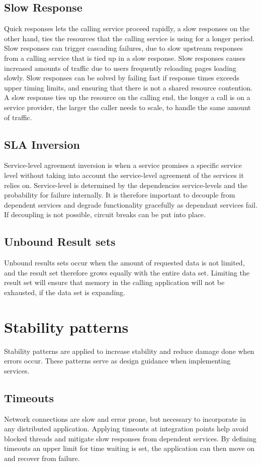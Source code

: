 \subsection{Slow Response}
Quick responses lets the calling service proceed rapidly, a slow responses on the other hand, ties the resources that the calling service is using for a longer period. Slow responses can trigger cascading failures, due to slow upstream responses from a calling service that is tied up in a slow response. Slow responses causes increased amounts of traffic due to users frequently reloading pages loading slowly. Slow responses can be solved by failing fast if response times exceeds upper timing limits, and ensuring that there is not a shared resource contention.
A slow response ties up the resource on the calling end, the longer a call is on a service provider, the larger the caller needs to scale, to handle the same amount of traffic.

\subsection{SLA Inversion}
Service-level agreement inversion is when a service promises a specific service level without taking into account the service-level agreement of the services it relies on. Service-level is determined by the dependencies service-levels and the probability for failure internally. It is therefore important to decouple from dependent services and degrade functionality gracefully as dependant services fail. If decoupling is not possible, circuit breaks can be put into place. 

\subsection{Unbound Result sets}
Unbound results sets occur when the amount of requested data is not limited, and the result set therefore grows equally with the entire data set. Limiting the result set will ensure that memory in the calling application will not be exhausted, if the data set is expanding.


\section{Stability patterns}
Stability patterns are applied to increase stability and reduce damage done when errors occur. These patterns serve as design guidance when implementing services.


\subsection{Timeouts}
Network connections are slow and error prone, but necessary to incorporate in any distributed application. Applying timeouts at integration points help avoid blocked threads and mitigate slow responses from dependent services. By defining timeouts an upper limit for time waiting is set, the application can then move on and recover from failure.

